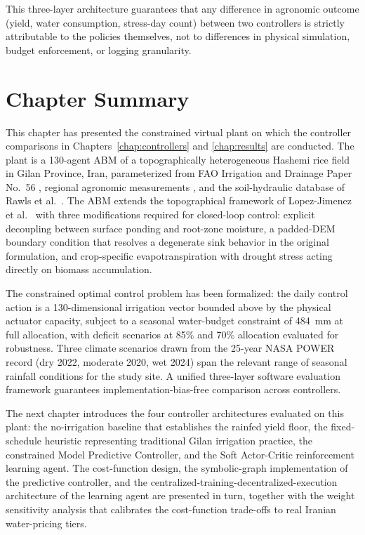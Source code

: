 This three-layer architecture guarantees that any difference in
agronomic outcome (yield, water consumption, stress-day count) between
two controllers is strictly attributable to the policies themselves,
not to differences in physical simulation, budget enforcement, or
logging granularity.

\section{Chapter Summary}
\label{sec:sys-summary}

This chapter has presented the constrained virtual plant on which the
controller comparisons in Chapters~\ref{chap:controllers} and
\ref{chap:results} are conducted. The plant is a 130-agent ABM of a
topographically heterogeneous Hashemi rice field in Gilan Province,
Iran, parameterized from FAO Irrigation and Drainage Paper No.~56
\cite{allen1998}, regional agronomic measurements
\cite{jalali2021,sadidi2021}, and the soil-hydraulic database of Rawls
et al.~\cite{rawls1982}. The ABM extends the topographical framework
of Lopez-Jimenez et al.~\cite{Lopezjimenez2024} with three
modifications required for closed-loop control: explicit decoupling
between surface ponding and root-zone moisture, a padded-DEM boundary
condition that resolves a degenerate sink behavior in the original
formulation, and crop-specific evapotranspiration with drought stress
acting directly on biomass accumulation.

The constrained optimal control problem has been formalized: the daily
control action is a 130-dimensional irrigation vector bounded above by
the physical actuator capacity, subject to a seasonal water-budget
constraint of 484~mm at full allocation, with deficit scenarios at
85\% and 70\% allocation evaluated for robustness. Three climate
scenarios drawn from the 25-year NASA POWER record (dry 2022,
moderate 2020, wet 2024) span the relevant range of seasonal rainfall
conditions for the study site. A unified three-layer software
evaluation framework guarantees implementation-bias-free comparison
across controllers.

The next chapter introduces the four controller architectures
evaluated on this plant: the no-irrigation baseline that establishes
the rainfed yield floor, the fixed-schedule heuristic representing
traditional Gilan irrigation practice, the constrained Model
Predictive Controller, and the Soft Actor-Critic reinforcement
learning agent. The cost-function design, the symbolic-graph
implementation of the predictive controller, and the
centralized-training-decentralized-execution architecture of the
learning agent are presented in turn, together with the weight
sensitivity analysis that calibrates the cost-function trade-offs to
real Iranian water-pricing tiers.
